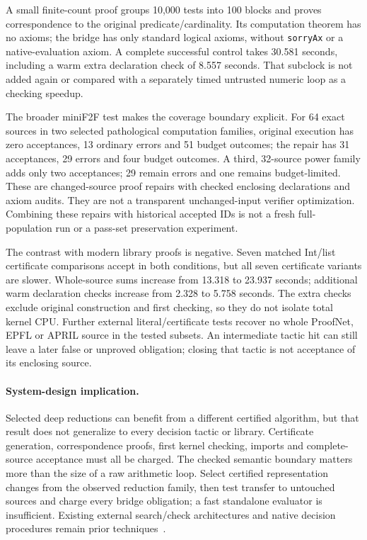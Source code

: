 \documentclass[10pt,twocolumn]{article}
\begin{document}
A small finite-count proof groups 10,000 tests into 100 blocks and proves
correspondence to the original predicate/cardinality.
Its computation theorem has no axioms; the bridge has only standard logical
axioms, without \texttt{sorryAx} or a native-evaluation axiom.
A complete successful control takes 30.581 seconds, including a warm extra
declaration check of 8.557 seconds.
That subclock is not added again or compared with a separately timed
untrusted numeric loop as a checking speedup.

The broader miniF2F test makes the coverage boundary explicit.
For 64 exact sources in two selected pathological computation families,
original execution has zero acceptances, 13 ordinary errors and 51 budget
outcomes; the repair has 31 acceptances, 29 errors and four budget outcomes.
A third, 32-source power family adds only two acceptances; 29 remain errors
and one remains budget-limited. These are changed-source proof repairs with
checked enclosing declarations and axiom audits.
They are not a transparent unchanged-input verifier optimization.
Combining these repairs with historical accepted IDs is not a fresh
full-population run or a pass-set preservation experiment.

The contrast with modern library proofs is negative.
Seven matched Int/list certificate comparisons accept in both conditions,
but all seven certificate variants are slower.
Whole-source sums increase from 13.318 to 23.937 seconds; additional warm
declaration checks increase from 2.328 to 5.758 seconds.
The extra checks exclude original construction and first checking, so they
do not isolate total kernel CPU.
Further external literal/certificate tests recover no whole ProofNet,
EPFL or APRIL source in the tested subsets.
An intermediate tactic hit can still leave a later false or unproved
obligation; closing that tactic is not acceptance of its enclosing source.

\paragraph{System-design implication.}
Selected deep reductions can benefit from a different certified algorithm,
but that result does not generalize to every decision tactic or library.
Certificate generation, correspondence proofs, first kernel checking,
imports and complete-source acceptance must all be charged.
The checked semantic boundary matters more than the size of a raw arithmetic
loop. Select certified representation changes from the observed reduction
family, then test transfer to untouched sources and charge every bridge
obligation; a fast standalone evaluator is insufficient.
Existing external search/check architectures and native decision
procedures remain prior techniques~\cite{mathlib,lean49DecideSource}.
\end{document}
